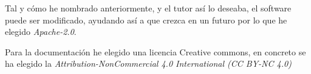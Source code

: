 Tal y cómo he nombrado anteriormente, y el tutor así lo deseaba, el software puede ser modificado, ayudando así a que crezca en un futuro
por lo que he elegido \emph{Apache-2.0}. 


Para la documentación he elegido una licencia Creative commons, en concreto se ha elegido la \emph{Attribution-NonCommercial 4.0 International (CC BY-NC 4.0)}





